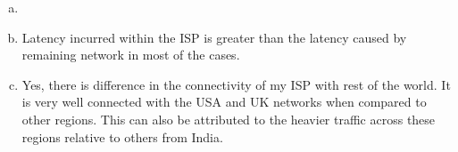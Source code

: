 \documentclass{article}
\begin{document}
\begin{enumerate}[a)]
        \item 
        \item Latency incurred within the ISP is greater than the latency caused by remaining network in most of the cases.\\
        \setlength{\tabcolsep}{10pt} %
                \renewcommand{\arraystretch}{0.9} %
                \begin{table}[htbp]
                    \centering
        \caption{-1}
        \end{table}
        \item Yes, there is difference in the connectivity of my ISP with rest of the world. It is very well connected with the USA and UK networks when compared to other regions. This can also be attributed to the heavier traffic across these regions relative to others from India.
    \end{enumerate}{}
    \clearpage
\end{document}
